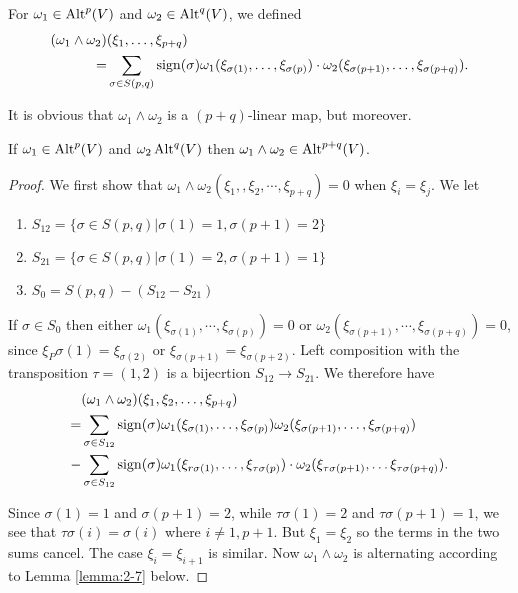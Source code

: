 \begin{definition}\label{def:2-5}
  For $\omega_1\in\operatorname{Alt}^p(V)$ and $\omega_2\in\operatorname{Alt}^q(V)$, we defined
  \begin{align*}
    (\omega_1\wedge\omega_2) & (\xi_1,\ldots,\xi_{p+q})                                                             \\
    =                        & \sum_{\sigma\in S(p,q)}\operatorname{sign}(\sigma)\omega_1(\xi_{\sigma(1)},\ldots,\xi_{\sigma(p)})
    \cdot\omega_2(\xi_{\sigma(p+1)},\ldots,\xi_{\sigma(p+q)}).
  \end{align*}

  It is obvious that $\omega_1\wedge\omega_2$ is a $(p+q)$-linear map, but moreover.
\end{definition}

\begin{lemma}\label{lemma:2-2}
  If $\omega_1\in\operatorname{Alt}^p(V)$ and $\omega_2\operatorname{Alt}^q(V)$ then $\omega_1\wedge\omega_2\in\operatorname{Alt}^{p+q}(V)$.
\end{lemma}

\begin{proof}
  We first show that $\omega_1\wedge\omega_2(\xi_1,, \xi_2, \cdots, \xi_{p+q}) = 0$ when $\xi_i = \xi_j$.
  We let
  \begin{enumerate}[label=(\roman*)]
    \item $S_{12} = \{\sigma\in S(p, q) | \sigma(1) = 1, \sigma(p+1) = 2\}$
    \item $S_{21} = \{\sigma\in S(p, q) | \sigma(1) = 2, \sigma(p+1) = 1\}$
    \item $S_0 = S(p, q) - (S_{12} - S_{21})$
  \end{enumerate}

  If $\sigma\in S_0$ then either $\omega_1(\xi_{\sigma(1)}, \cdots, \xi_{\sigma(p)}) = 0$
  or $\omega_2(\xi_{\sigma(p+1)}, \cdots, \xi_{\sigma(p+q)}) = 0$, since $\xi_P\sigma(1) = \xi_{\sigma(2)}$
  or $\xi_{\sigma(p+1)} = \xi_{\sigma(p+2)}$. Left composition with  the transposition $\tau = (1, 2)$ is a bijecrtion
  $S_{12}\to S_{21}$. We therefore have
  \begin{align*}
      & (\omega_{1}\wedge\omega_{2})(\xi_{1},\xi_{2},\ldots,\xi_{p+q})                                                                                             \\
    = & \sum_{\sigma\in S_{12}}\operatorname{sign}(\sigma)\omega_1(\xi_{\sigma(1)},\ldots,\xi_{\sigma(p)})\omega_2(\xi_{\sigma(p+1)},\ldots,\xi_{\sigma(p+q)})                   \\
    - & \sum_{\sigma\in S_{12}}\operatorname{sign}(\sigma)\omega_1(\xi_{r\sigma(1)},\ldots,\xi_{\tau\sigma(p)})\cdot\omega_2(\xi_{\tau\sigma(p+1)},\ldots\xi_{\tau\sigma(p+q)}).
  \end{align*}

  Since $\sigma(1) = 1$ and $\sigma(p+1) = 2$, while $\tau\sigma(1) = 2$ and $\tau\sigma(p+1) = 1$, we see that
  $\tau\sigma(i) = \sigma(i)$ where $i\neq 1, p+1$. But $\xi_1 = \xi_2$ so the terms in the two sums cancel.
  The case $\xi_i = \xi_{i+1}$ is similar. Now $\omega_1\wedge\omega_2$ is alternating according to Lemma \ref{lemma:2-7} below.
\end{proof}

